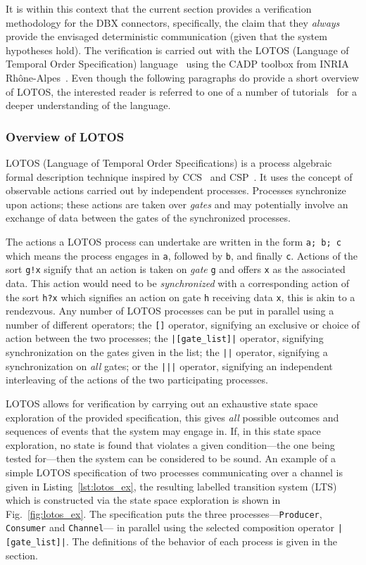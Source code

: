 It is within this context that the current section provides a
verification methodology for the DBX connectors, specifically, the
claim that they \emph{always} provide the envisaged deterministic
communication (given that the system hypotheses hold). The
verification is carried out with the LOTOS (Language of Temporal
Order Specification) language~\cite{bolognesi@cnis87} using the CADP
toolbox from INRIA Rh\^one-Alpes~\cite{garavel@cav07}. Even though the
following paragraphs do provide a short overview of LOTOS, the
interested reader is referred to one of a number of
tutorials~\cite{bolognesi@cnis87, logrippo@cnis92} for a deeper
understanding of the language.

\subsubsection{Overview of LOTOS}
LOTOS (Language of Temporal Order Specifications) is a process
algebraic formal description technique inspired by
CCS~\cite{milner-cc} and CSP~\cite{hoare@cacm78}. It uses the concept
of observable actions carried out by independent processes. Processes
synchronize upon actions; these actions are taken over \emph{gates}
and may potentially involve an exchange of data between the gates of
the synchronized processes.

The actions a LOTOS process can undertake are written in the form
\texttt{a; b; c} which means the process engages in \texttt{a},
followed by \texttt{b}, and finally \texttt{c}. Actions of the sort
\texttt{g!x} signify that an action is taken on \emph{gate} \texttt{g}
and offers \texttt{x} as the associated data. This action would need
to be \emph{synchronized} with a corresponding action of the sort
\texttt{h?x} which signifies an action on gate \texttt{h} receiving
data \texttt{x}, this is akin to a rendezvous. Any number of LOTOS
processes can be put in parallel using a number of different
operators; the \texttt{[]} operator, signifying an exclusive or choice
of action between the two processes; the \texttt{|[gate\_list]|}
operator, signifying synchronization on the gates given in the list;
the \texttt{||} operator, signifying a synchronization on \emph{all}
gates; or the \texttt{|||} operator, signifying an independent
interleaving of the actions of the two participating processes.

LOTOS allows for verification by carrying out an exhaustive state
space exploration of the provided specification, this gives \emph{all}
possible outcomes and sequences of events that the system may engage
in. If, in this state space exploration, no state is found that
violates a given condition---the one being tested for---then the
system can be considered to be sound. An example of a simple LOTOS
specification of two processes communicating over a channel is given
in Listing~\ref{lst:lotos_ex}, the resulting labelled transition
system (LTS) which is constructed via the state space exploration is
shown in Fig.~\ref{fig:lotos_ex}. The specification puts the three
processes---\texttt{Producer}, \texttt{Consumer} and
\texttt{Channel}--- in parallel using the selected composition
operator \texttt{|[gate\_list]|}. The definitions of the behavior of
each process is given in the  section.

